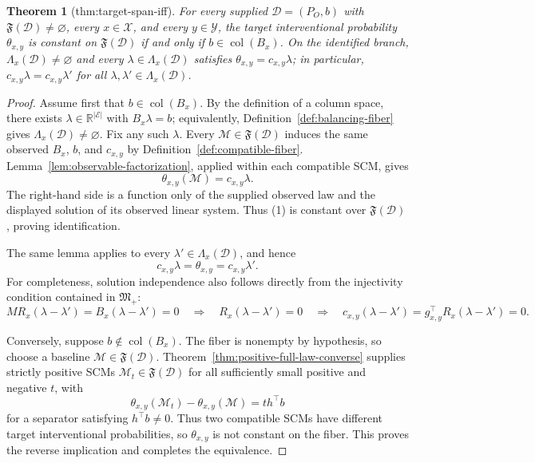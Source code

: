 \documentclass{article}
\newtheorem{theorem}{Theorem}
\begin{document}
\begin{theorem}[thm:target-span-iff]\label{thm:target-span-iff}
For every supplied \(\mathcal D=(P_O,b)\) with \(\mathfrak F(\mathcal D)\ne\varnothing\), every \(x\in\mathcal X\), and every \(y\in\mathcal Y\), the target interventional probability \(\theta_{x,y}\) is constant on \(\mathfrak F(\mathcal D)\) if and only if \(b\in\operatorname{col}(B_x)\). On the identified branch, \(\Lambda_x(\mathcal D)\ne\varnothing\) and every \(\lambda\in\Lambda_x(\mathcal D)\) satisfies \(\theta_{x,y}=c_{x,y}\lambda\); in particular, \(c_{x,y}\lambda=c_{x,y}\lambda'\) for all \(\lambda,\lambda'\in\Lambda_x(\mathcal D)\).
\end{theorem}
\begin{proof}
Assume first that \(b\in\operatorname{col}(B_x)\). By the definition of a column space, there exists \(\lambda\in\mathbb R^{\lvert\mathcal E\rvert}\) with \(B_x\lambda=b\); equivalently, Definition~\ref{def:balancing-fiber} gives \(\Lambda_x(\mathcal D)\ne\varnothing\). Fix any such \(\lambda\). Every \(\mathcal M\in\mathfrak F(\mathcal D)\) induces the same observed \(B_x\), \(b\), and \(c_{x,y}\) by Definition~\ref{def:compatible-fiber}. Lemma~\ref{lem:observable-factorization}, applied within each compatible SCM, gives
\[
\theta_{x,y}(\mathcal M)=c_{x,y}\lambda.
\tag{1}
\]
The right-hand side is a function only of the supplied observed law and the displayed solution of its observed linear system. Thus (1) is constant over \(\mathfrak F(\mathcal D)\), proving identification.

The same lemma applies to every \(\lambda'\in\Lambda_x(\mathcal D)\), and hence
\[
c_{x,y}\lambda=\theta_{x,y}=c_{x,y}\lambda'.
\tag{2}
\]
For completeness, solution independence also follows directly from the injectivity condition contained in \(\mathfrak M_{+}\):
\[
M R_x(\lambda-\lambda')=B_x(\lambda-\lambda')=0
\quad\Longrightarrow\quad
R_x(\lambda-\lambda')=0
\quad\Longrightarrow\quad
c_{x,y}(\lambda-\lambda')=g_{x,y}^{\top}R_x(\lambda-\lambda')=0.
\tag{3}
\]

Conversely, suppose \(b\notin\operatorname{col}(B_x)\). The fiber is nonempty by hypothesis, so choose a baseline \(\mathcal M\in\mathfrak F(\mathcal D)\). Theorem~\ref{thm:positive-full-law-converse} supplies strictly positive SCMs \(\mathcal M_t\in\mathfrak F(\mathcal D)\) for all sufficiently small positive and negative \(t\), with
\[
\theta_{x,y}(\mathcal M_t)-\theta_{x,y}(\mathcal M)=t h^{\top}b
\tag{4}
\]
for a separator satisfying \(h^{\top}b\ne0\). Thus two compatible SCMs have different target interventional probabilities, so \(\theta_{x,y}\) is not constant on the fiber. This proves the reverse implication and completes the equivalence.
\end{proof}
\end{document}
